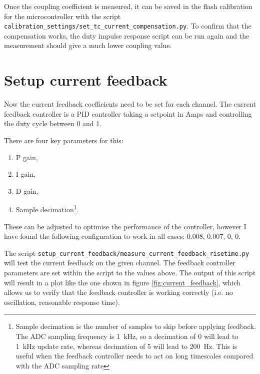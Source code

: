 \documentclass{article}
\begin{document}
Once the coupling coefficient is measured, it can be saved in the flash calibration for the microcontroller with the script \texttt{calibration\_settings/set\_tc\_current\_compensation.py}. To confirm that the compensation works, the duty impulse response script can be run again and the measurement should give a much lower coupling value.


\clearpage
\section{Setup current feedback}

Now the current feedback coefficients need to be set for each channel.
The current feedback controller is a PID controller taking a setpoint in Amps and controlling the duty cycle between 0 and 1.

There are four key parameters for this:
\begin{enumerate}
\item P gain,
\item I gain,
\item D gain,
\item Sample decimation\footnote{Sample decimation is the number of samples to skip before applying feedback. The ADC sampling frequency is \SI{1}{kHz}, so a decimation of 0 will lead to \SI{1}{kHz} update rate, whereas decimation of 5 will lead to \SI{200}{Hz}. This is useful when the feedback controller needs to act on long timescales compared with the ADC sampling rate}.
\end{enumerate}
These can be adjusted to optimise the performance of the controller, however I have found the following configuration to work in all cases:
0.008, 0.007, 0, 0.

The script \texttt{setup\_current\_feedback/measure\_current\_feedback\_risetime.py} will test the current feedback on the given channel. The feedback controller parameters are set within the script to the values above. The output of this script will result in a plot like the one shown in figure \ref{fig:current_feedback}, which allows us to verify that the feedback controller is working correctly (i.e. no oscillation, reasonable response time).
\end{document}
